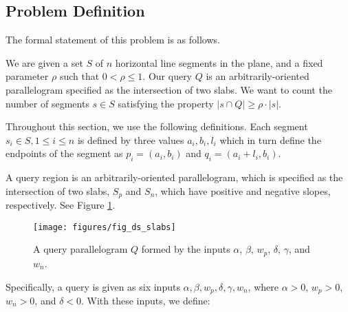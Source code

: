 \subsection{Problem Definition}
\label{:slabs:two:problem}

The formal statement of this problem is as follows.

\begin{problem}
We are given a set $S$ of $n$ horizontal line segments in the plane, and a fixed parameter $\rho$ such that $0 < \rho \leq 1$. Our query $Q$ is an arbitrarily-oriented parallelogram specified as the intersection of two slabs. We want to count the number of segments $s \in S$  satisfying the property $|s \cap Q| \geq \rho \cdot |s|$.
\end{problem}

Throughout this section, we use the following definitions. Each segment $s_i \in S, 1 \leq i \leq n$ is defined by three values $a_i, b_i, l_i$ which in turn define the endpoints of the segment as $p_i = (a_i, b_i)$ and $q_i = (a_i + l_i, b_i)$.

A query region is an arbitrarily-oriented parallelogram, which is specified as the intersection of two slabs, $S_p$ and $S_n$, which have positive and negative slopes, respectively. See Figure \ref{fig:slabs:two:ds}.

\begin{figure}[t]
\begin{center}
  \texttt{[image: figures/fig\_ds\_slabs]}
  \caption{A query parallelogram $Q$ formed by the inputs $\alpha$, $\beta$, $w_p$,
  $\delta$, $\gamma$, and $w_n$.}
  \label{fig:slabs:two:ds}
\end{center}
\end{figure}

Specifically, a query is given as six inputs $\alpha, \beta, w_p, \delta, \gamma, w_n$, where $\alpha > 0$, $w_p > 0$, $w_n > 0$, and $\delta < 0$. With these inputs, we define:

